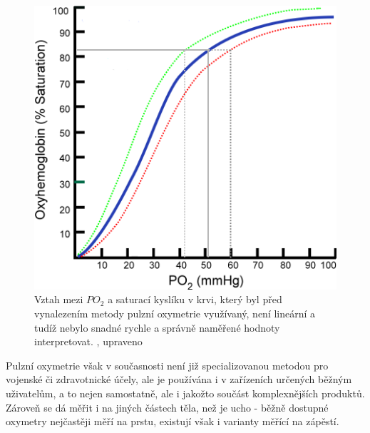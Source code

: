 \begin{figure}[H]
  \includegraphics[scale=1, center]{Kapitoly/Teoreticka/Obrazky/TlakKysliku.png}
  \caption [Vztah mezi $PO_2$ a saturací kyslíku v krvi]{Vztah mezi $PO_2$ a saturací kyslíku v krvi, který byl před vynalezením metody pulzní oxymetrie využívaný, není lineární a tudíž nebylo snadné rychle a správně naměřené hodnoty interpretovat. \citep{ratznium_2006}, upraveno}
  \label{fig:PO2}
\end{figure}
\par Pulzní oxymetrie však v současnosti není již specializovanou metodou pro vojenské či zdravotnické účely, ale je používána i v zařízeních určených běžným uživatelům, a to nejen samostatně, ale i jakožto součást komplexnějších produktů. Zároveň se dá měřit i na jiných částech těla, než je ucho - běžně dostupné oxymetry nejčastěji měří na prstu, existují však i varianty měřící na zápěstí.
